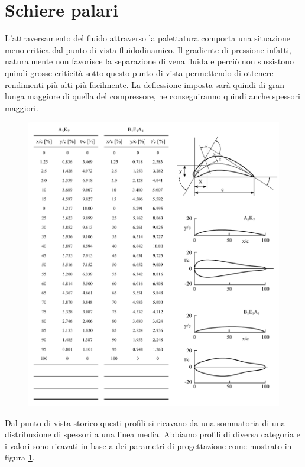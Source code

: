 \section{Schiere palari}
L'attraversamento del fluido attraverso la palettatura comporta una situazione meno critica dal punto di vista fluidodinamico. Il gradiente di pressione infatti, naturalmente non favorisce la separazione di vena fluida e perciò non sussistono quindi grosse criticità sotto questo punto di vista permettendo di ottenere rendimenti più alti più facilmente. La deflessione imposta sarà quindi di gran lunga maggiore di quella del compressore, ne conseguiranno quindi anche spessori maggiori. 
\begin{figure}
\centering
  \includegraphics[width=\textwidth]{fig/SchierePaleTab.pdf}
\caption{}
\label{fig:SchierePaleTab}
\end{figure}
Dal punto di vista storico questi profili si ricavano da una sommatoria di una distribuzione di spessori a una linea media. Abbiamo profili di diversa categoria e i valori sono ricavati in base a dei parametri di progettazione come mostrato in figura \ref{fig:SchierePaleTab}.

